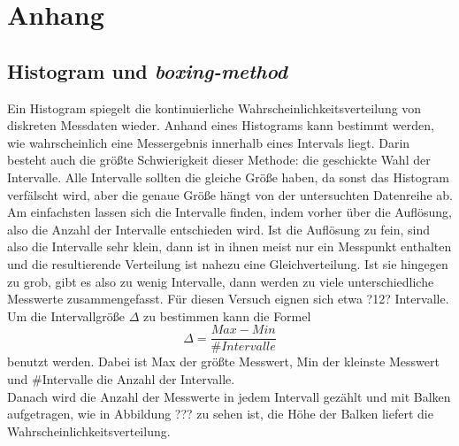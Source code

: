 \section*{Anhang}

\subsection*{Histogram und \emph{boxing-method}}
Ein Histogram spiegelt die kontinuierliche Wahrscheinlichkeitsverteilung von diskreten Messdaten wieder. Anhand eines Histograms kann bestimmt werden, wie wahrscheinlich eine Messergebnis innerhalb eines Intervals liegt. Darin besteht auch die größte Schwierigkeit dieser Methode: die geschickte Wahl der Intervalle. Alle Intervalle sollten die gleiche Größe haben, da sonst das Histogram verfälscht wird, aber die genaue Größe hängt von der untersuchten  Datenreihe ab.\\
Am einfachsten lassen sich die Intervalle finden, indem vorher über die Auflösung, also die Anzahl der Intervalle entschieden wird.  Ist die Auflösung zu fein, sind also die Intervalle sehr klein, dann ist in ihnen meist nur ein Messpunkt enthalten und die resultierende Verteilung ist nahezu eine Gleichverteilung. Ist sie hingegen zu grob, gibt es also zu wenig Intervalle, dann werden zu viele unterschiedliche Messwerte zusammengefasst. Für diesen Versuch eignen sich etwa ?12? Intervalle. Um die Intervallgröße $\Delta$ zu bestimmen kann die Formel
\begin{equation}
  \Delta = \frac{Max - Min}{\#Intervalle}
\end{equation}
benutzt werden. Dabei ist Max der größte Messwert, Min der kleinste Messwert und \#Intervalle die Anzahl der Intervalle.\\
Danach wird die Anzahl der Messwerte in jedem Intervall gezählt und mit Balken aufgetragen, wie in Abbildung ??? zu sehen ist, die Höhe der Balken liefert die Wahrscheinlichkeitsverteilung.

